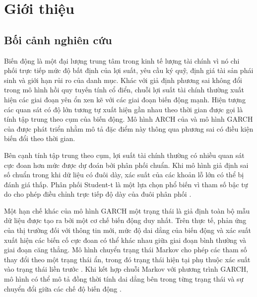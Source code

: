 \documentclass[12pt,a4paper]{article}
\numberwithin{equation}{section}
\begin{document}
\clearpage
{}
\setcounter{page}{1}
\pagestyle{mainpaper}

\section{Giới thiệu}\label{sec:gioi-thieu}

\subsection{Bối cảnh nghiên cứu}\label{subsec:boi-canh}

Biến động là một đại lượng trung tâm trong kinh tế lượng tài chính vì nó chi phối trực tiếp mức độ bất định của lợi suất, yêu cầu ký quỹ, định giá tài sản phái sinh và giới hạn rủi ro của danh mục. Khác với giả định phương sai không đổi trong mô hình hồi quy tuyến tính cổ điển, chuỗi lợi suất tài chính thường xuất hiện các giai đoạn yên ổn xen kẽ với các giai đoạn biến động mạnh. Hiện tượng các quan sát có độ lớn tương tự xuất hiện gần nhau theo thời gian được gọi là tính tập trung theo cụm của biến động. Mô hình ARCH của \cite{engle1982} và mô hình GARCH của \cite{bollerslev1986} được phát triển nhằm mô tả đặc điểm này thông qua phương sai có điều kiện biến đổi theo thời gian.

Bên cạnh tính tập trung theo cụm, lợi suất tài chính thường có nhiều quan sát cực đoan hơn mức được dự đoán bởi phân phối chuẩn. Khi mô hình giả định sai số chuẩn trong khi dữ liệu có đuôi dày, xác suất của các khoản lỗ lớn có thể bị đánh giá thấp. Phân phối Student-t là một lựa chọn phổ biến vì tham số bậc tự do cho phép điều chỉnh trực tiếp độ dày của đuôi phân phối \cite{bollerslev1987}.

Một hạn chế khác của mô hình GARCH một trạng thái là giả định toàn bộ mẫu dữ liệu được tạo ra bởi một cơ chế biến động duy nhất. Trên thực tế, phản ứng của thị trường đối với thông tin mới, mức độ dai dẳng của biến động và xác suất xuất hiện các biến cố cực đoan có thể khác nhau giữa giai đoạn bình thường và giai đoạn căng thẳng. Mô hình chuyển trạng thái Markov cho phép các tham số thay đổi theo một trạng thái ẩn, trong đó trạng thái hiện tại phụ thuộc xác suất vào trạng thái liền trước \cite{hamilton1989}. Khi kết hợp chuỗi Markov với phương trình GARCH, mô hình có thể mô tả đồng thời tính dai dẳng bên trong từng trạng thái và sự chuyển đổi giữa các chế độ biến động \cite{gray1996,klaassen2002,haas2004}.
\end{document}
